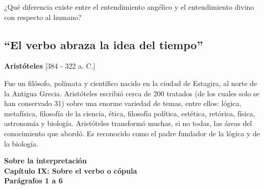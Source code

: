 \documentclass{article}
\begin{document}
    \noindent ¿Qué diferencia existe entre el entendimiento angélico y el entendimiento divino con respecto al humano? \par

\subsection{``El verbo abraza la idea del tiempo''}

\begin{center}
    \large{\textbf{Aristóteles} [384 - 322 a. C.]}
\end{center}
    Fue un filósofo, polímata y científico nacido en la ciudad de Estagira, al norte de la Antigua Grecia. Aristóteles escribió cerca de 200 tratados (de los cuales solo se han conservado 31) sobre una enorme variedad de temas, entre ellos: lógica, metafísica, filosofía de la ciencia, ética, filosofía política, estética, retórica, física, astronomía y biología. Aristóteles transformó muchas, si no todas, las áreas del conocimiento que abordó. Es reconocido como el padre fundador de la lógica y de la biología. \par
    
\begin{center}
    \large{\textbf{Sobre la interpretación \\
    Capítulo IX: Sobre el verbo o cópula \\
    Parágrafos 1 a 6}}
\end{center}
    
\end{document}
